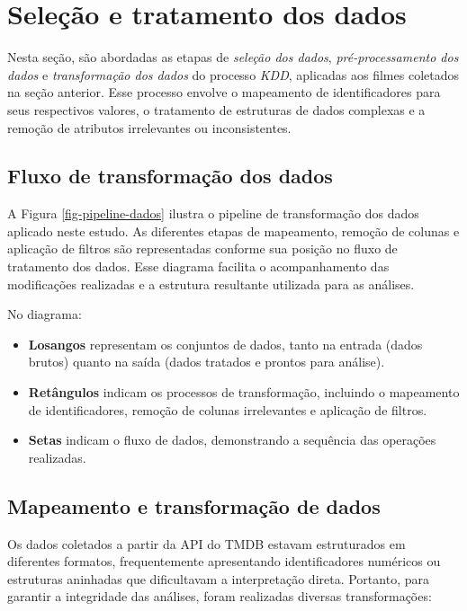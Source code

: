 \section{Seleção e tratamento dos dados}
Nesta seção, são abordadas as etapas de \textit{seleção dos dados}, \textit{pré-processamento dos dados} e \textit{transformação dos dados} do processo \textit{\acrshort{KDD}}, aplicadas aos filmes coletados na seção anterior. Esse processo envolve o mapeamento de identificadores para seus respectivos valores, o tratamento de estruturas de dados complexas e a remoção de atributos irrelevantes ou inconsistentes.

\subsection{Fluxo de transformação dos dados}

A Figura \ref{fig-pipeline-dados} ilustra o pipeline de transformação dos dados aplicado neste estudo. As diferentes etapas de mapeamento, remoção de colunas e aplicação de filtros são representadas conforme sua posição no fluxo de tratamento dos dados. Esse diagrama facilita o acompanhamento das modificações realizadas e a estrutura resultante utilizada para as análises.

No diagrama:
\begin{itemize}
    \item \textbf{Losangos} representam os conjuntos de dados, tanto na entrada (dados brutos) quanto na saída (dados tratados e prontos para análise).
    \item \textbf{Retângulos} indicam os processos de transformação, incluindo o mapeamento de identificadores, remoção de colunas irrelevantes e aplicação de filtros.
    \item \textbf{Setas} indicam o fluxo de dados, demonstrando a sequência das operações realizadas.
\end{itemize}

%

\subsection{Mapeamento e transformação de dados}

Os dados coletados a partir da \acrshort{API} do \acrshort{TMDB} estavam estruturados em diferentes formatos, frequentemente apresentando identificadores numéricos ou estruturas aninhadas que dificultavam a interpretação direta. Portanto, para garantir a integridade das análises, foram realizadas diversas transformações:

